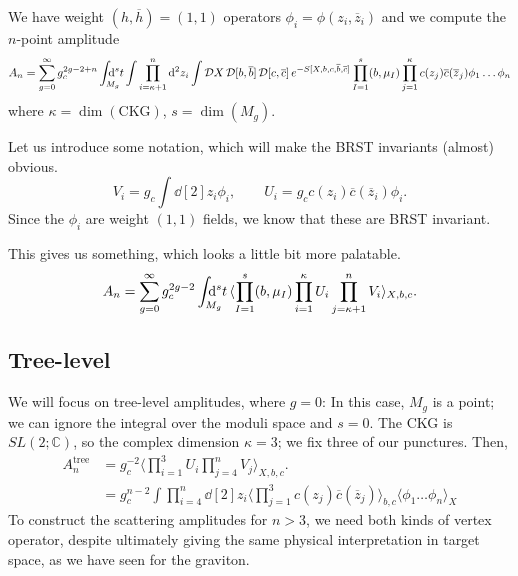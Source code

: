 We have weight $(h, \overline{h}{}) = (1, 1)$ operators $\phi_i = \phi(z_i, \overline{z}{}_i)$ and we compute the $n$-point amplitude
\begin{equation}
  A_{n} = \sum_{g = 0}^{\infty} g_c^{2 g - 2 + n} \int_{\mathrlap{M_g}} \dd[s]{t} \int \prod_{i = \kappa + 1}^n \dd[2]{z_i} \int \pdd{X} \pdd{[b, \overline{b}{}]} \pdd{[c, \overline{c}{}]} e^{-S[X, b, c, \overline{b}{}, \overline{c}{}]} \prod_{I = 1}^s (b, \mu_I) \prod_{j=1}^\kappa c(z_j) \overline{c}{}(\overline{z}{}_j) \phi_1 \dots \phi_n
\end{equation}
where $\kappa = \dim(\text{CKG})$, $s = \dim(M_g)$.

Let us introduce some notation, which will make the BRST invariants (almost) obvious.
\begin{equation}
  V_i = g_c \int \dd[2]{z_i} \phi_i, \qquad U_i = g_c c(z_i) \overline{c}{}(\overline{z}{}_i) \phi_i.
\end{equation}
Since the $\phi_i$ are weight $(1, 1)$ fields, we know that these are BRST invariant.

This gives us something, which looks a little bit more palatable.
\begin{equation}
  A_n = \sum_{g=0}^{\infty} g_c^{2g-2} \int_{\mathrlap{M_g}} \dd[s]{t} \langle \prod_{I=1}^s (b, \mu_I) \prod_{i=1}^{\kappa} U_i \prod_{j=\kappa + 1}^{n} V_i \rangle_{X, b, c}.
\end{equation}

\subsection*{Tree-level}%


We will focus on tree-level amplitudes, where $g = 0$:
In this case, $M_g$ is a point; we can ignore the integral over the moduli space and $s = 0$.
The CKG is $SL(2; \mathbb{C})$, so the complex dimension $\kappa = 3$; we fix three of our punctures.
Then,
\begin{align}
  A_n^{\text{tree}} &= g_c^{-2} \langle \prod_{i=1}^3 U_i \prod_{j=4}^n V_j \rangle_{X, b, c}. \\
		    &= g_c^{n-2} \int \prod_{i=4}^n \dd[2]{z_i} \langle \prod_{j=1}^{3} c(z_j) \overline{c}{}(\overline{z}{}_j) \rangle_{b, c} \langle \phi_1 \dots \phi_n \rangle_{X}
\end{align}
To construct the scattering amplitudes for $n > 3$, we need both kinds of vertex operator, despite ultimately giving the same physical interpretation in target space, as we have seen for the graviton.


